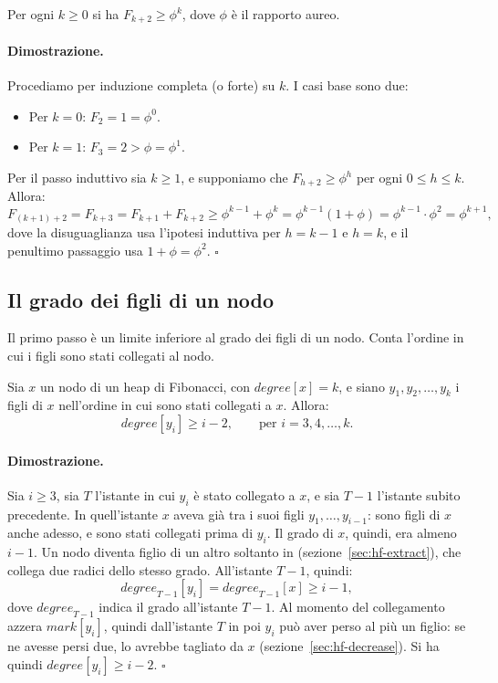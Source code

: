 \begin{lemma}\label{lem:hf-phi}
Per ogni $k \ge 0$ si ha $F_{k+2} \ge \phi^k$, dove $\phi$ è il rapporto aureo.
\end{lemma}

\paragraph{Dimostrazione.}
Procediamo per induzione completa (o forte) su $k$. I casi base sono due:
\begin{itemize}
    \item Per $k = 0$: $F_2 = 1 = \phi^0$.
    \item Per $k = 1$: $F_3 = 2 > \phi = \phi^1$.
\end{itemize}
Per il passo induttivo sia $k \ge 1$, e supponiamo che $F_{h+2} \ge \phi^h$ per ogni $0 \le h \le k$. Allora:
\[
F_{(k+1)+2} = F_{k+3} = F_{k+1} + F_{k+2} \ge \phi^{k-1} + \phi^k = \phi^{k-1}(1 + \phi) = \phi^{k-1} \cdot \phi^2 = \phi^{k+1},
\]
dove la disuguaglianza usa l'ipotesi induttiva per $h = k-1$ e $h = k$, e il penultimo passaggio usa $1 + \phi = \phi^2$. \hfill $\square$

\subsection{Il grado dei figli di un nodo}\label{sec:hf-figli}
Il primo passo è un limite inferiore al grado dei figli di un nodo. Conta l'ordine in cui i figli sono stati collegati al nodo.

\begin{lemma}\label{lem:hf-figli}
Sia $x$ un nodo di un heap di Fibonacci, con $\mathit{degree}[x] = k$, e siano $y_1, y_2, \ldots, y_k$ i figli di $x$ nell'ordine in cui sono stati collegati a $x$. Allora:
\[
\mathit{degree}[y_i] \ge i - 2, \qquad \text{per } i = 3, 4, \ldots, k.
\]
\end{lemma}

\paragraph{Dimostrazione.}
Sia $i \ge 3$, sia $T$ l'istante in cui $y_i$ è stato collegato a $x$, e sia $T-1$ l'istante subito precedente. In quell'istante $x$ aveva già tra i suoi figli $y_1, \ldots, y_{i-1}$: sono figli di $x$ anche adesso, e sono stati collegati prima di $y_i$. Il grado di $x$, quindi, era almeno $i - 1$. Un nodo diventa figlio di un altro soltanto in \Consolidate{} (sezione~\ref{sec:hf-extract}), che collega due radici dello stesso grado. All'istante $T-1$, quindi:
\[
\mathit{degree}_{T-1}[y_i] = \mathit{degree}_{T-1}[x] \ge i - 1,
\]
dove $\mathit{degree}_{T-1}$ indica il grado all'istante $T-1$. Al momento del collegamento \FibHeapLink{} azzera $\mathit{mark}[y_i]$, quindi dall'istante $T$ in poi $y_i$ può aver perso al più un figlio: se ne avesse persi due, \CascadingCut{} lo avrebbe tagliato da $x$ (sezione~\ref{sec:hf-decrease}). Si ha quindi $\mathit{degree}[y_i] \ge i - 2$. \hfill $\square$


